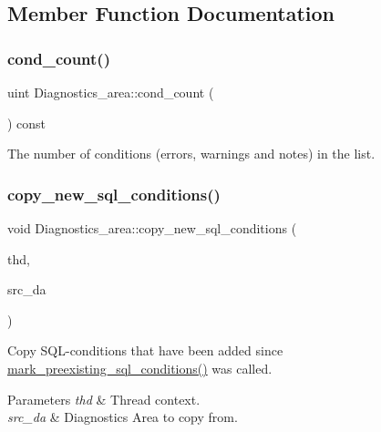 \subsection{Member Function Documentation}
\mbox{\label{classDiagnostics__area_ac101e4a8bc5d0780a118699c8ca7a775}} 
\subsubsection{\texorpdfstring{cond\+\_\+count()}{cond\_count()}}
{\footnotesize\ttfamily uint Diagnostics\+\_\+area\+::cond\+\_\+count (\begin{DoxyParamCaption}{ }\end{DoxyParamCaption}) const\hspace{0.3cm}{\ttfamily [inline]}}

The number of conditions (errors, warnings and notes) in the list. \mbox{\label{classDiagnostics__area_a8ba22c7357c66a3672791b84fe836b18}} 
\subsubsection{\texorpdfstring{copy\+\_\+new\+\_\+sql\+\_\+conditions()}{copy\_new\_sql\_conditions()}}
{\footnotesize\ttfamily void Diagnostics\+\_\+area\+::copy\+\_\+new\+\_\+sql\+\_\+conditions (\begin{DoxyParamCaption}\item[{T\+HD $\ast$}]{thd,  }\item[{const \mbox{\hyperlink{classDiagnostics__area}{Diagnostics\+\_\+area}} $\ast$}]{src\+\_\+da }\end{DoxyParamCaption})}

Copy S\+QL-\/conditions that have been added since \mbox{\hyperlink{classDiagnostics__area_a49941326d0fd428be3f52eb3349419ca}{mark\+\_\+preexisting\+\_\+sql\+\_\+conditions()}} was called.


\begin{DoxyParams}{Parameters}
{\em thd} & Thread context. \\
\hline
{\em src\+\_\+da} & Diagnostics Area to copy from. \\
\hline
\end{DoxyParams}
\mbox{\label{classDiagnostics__area_a8d2b08ea1b04ca4f486c3bc6b0a341bd}} 
